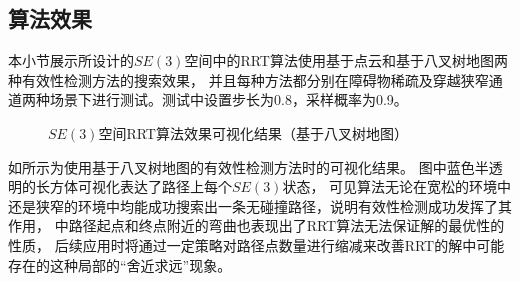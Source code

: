\subsection{算法效果}\label{subsec:performance_of_rrtse3}
本小节展示所设计的$SE(3)$空间中的RRT算法使用基于点云和基于八叉树地图两种有效性检测方法的搜索效果，
并且每种方法都分别在障碍物稀疏及穿越狭窄通道两种场景下进行测试。测试中设置步长为0.8，采样概率为0.9。
\begin{figure}[!ht]
  \setlength{\subfigcapskip}{-1bp}
  \centering
  \begin{minipage}{\textwidth}

  \centering
  \subfigure{\label{fig:rrtse3_octomap_in_sparse_env_overview}}\addtocounter{subfigure}{-2}
  \hspace{0.2em}
  \subfigure{\label{fig:rrtse3_octomap_in_sparse_env_detail}}\addtocounter{subfigure}{-2}
  \hspace{0.2em}
  \subfigure{\label{fig:rrtse3_octomap_in_narrow_passage_overview}}\addtocounter{subfigure}{-2}
  \hspace{0.2em}
  \subfigure{\label{fig:rrtse3_octomap_in_narrow_passage_detail}}\addtocounter{subfigure}{-2}
  
  \end{minipage}
  \caption{$SE(3)$空间RRT算法效果可视化结果（基于八叉树地图）}
  \label{fig:performance_of_rrtse3_octomap}
\end{figure}

如所示为使用基于八叉树地图的有效性检测方法时的可视化结果。
图中蓝色半透明的长方体可视化表达了路径上每个$SE(3)$状态，
可见算法无论在宽松的环境中还是狭窄的环境中均能成功搜索出一条无碰撞路径，说明有效性检测成功发挥了其作用，
中路径起点和终点附近的弯曲也表现出了RRT算法无法保证解的最优性的性质，
后续应用时将通过一定策略对路径点数量进行缩减来改善RRT的解中可能存在的这种局部的“舍近求远”现象。

